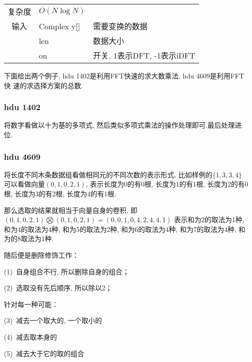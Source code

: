 \begin{longtable}{|c|l|l|}
复杂度 & $O(N\log N)$ &  \\
输入 & Complex y[] & 需要变换的数据 \\
 & len & 数据大小 \\
 & on & 开关, 1表示DFT, -1表示iDFT \\
\end{longtable}
下面给出两个例子, hdu 1402是利用FFT快速的求大数乘法, hdu 4609是利用FFT快
速的求选择方案的总数.


        \subsubsection{hdu 1402}\small
将数字看做以十为基的多项式, 然后类似多项式乘法的操作处理即可.最后处理进位.



        \subsubsection{hdu 4609}\small
将长度不同木条数据组看做相同元的不同次数的表示形式, 比如样例的$\{1, 3, 3, 4\}$
可以看做向量$(0, 1, 0, 2, 1)$, 表示长度为0的有0根, 长度为1的有1根, 长度为2的有0根, 
长度为3的有2根, 长度为4的有1根.

那么选取的结果就相当于向量自身的卷积, 即
$(0, 1, 0, 2, 1)\bigotimes (0, 1, 0, 2, 1) = (0, 0, 1, 0, 4, 2, 4, 4, 1)$
表示和为2的取法为1种, 和为4的取法为4种, 和为5的取法为2种, 和为6的取法为4种, 
和为7的取法为4种, 和为的8取法为1种.

随后便是删除修饰工作：

(1)\ 自身组合不行, 所以删除自身的组合；

(2)\ 选取没有先后顺序, 所以除以2；

针对每一种可能：

(3)\ 减去一个取大的, 一个取小的

(4)\ 减去取本身的

(5)\ 减去大于它的取的组合


